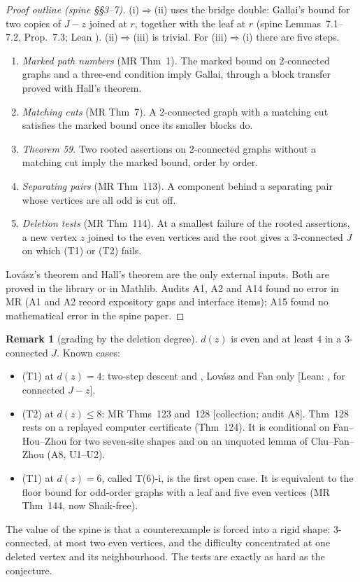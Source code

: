 \documentclass[11pt]{amsart}
\theoremstyle{definition}
\newtheorem{remark}[theorem]{Remark}
\newcommand{\st}[1]{\textsf{\small[#1]}}
\begin{document}
\begin{proof}[Proof outline (spine \S\S3--7)]
(i)$\Rightarrow$(ii) uses the bridge double: Gallai's bound for two copies of $J-z$ joined at
$r$, together with the leaf at $r$ (spine Lemmas~7.1--7.2, Prop.~7.3; Lean ).
(ii)$\Rightarrow$(iii) is trivial. For (iii)$\Rightarrow$(i) there are five steps.
\begin{enumerate}[leftmargin=*]
\item \emph{Marked path numbers} (MR Thm~1). The marked bound on $2$-connected graphs and a three-end
condition imply Gallai, through a block transfer proved with Hall's theorem.
\item \emph{Matching cuts} (MR Thm~7). A $2$-connected graph with a matching cut satisfies the marked
bound once its smaller blocks do.
\item \emph{Theorem 59}. Two rooted assertions on $2$-connected graphs without a matching cut imply
the marked bound, order by order.
\item \emph{Separating pairs} (MR Thm~113). A component behind a separating pair whose vertices are
all odd is cut off.
\item \emph{Deletion tests} (MR Thm~114). At a smallest failure of the rooted assertions, a new vertex
$z$ joined to the even vertices and the root gives a $3$-connected $J$ on which (T1) or (T2) fails.
\end{enumerate}
Lov\'asz's theorem and Hall's theorem are the only external inputs. Both are proved in the library or
in Mathlib. Audits A1, A2 and A14 found no error in MR (A1 and A2 record expository gaps and interface items);
A15 found no mathematical error in the spine paper.
\end{proof}

\begin{remark}[grading by the deletion degree]\label{rem:grading}
$d(z)$ is even and at least $4$ in a $3$-connected $J$. Known cases:
\begin{itemize}[leftmargin=*]
\item (T1) at $d(z)=4$: two-step descent and , Lovász and Fan only
\st{Lean: , for connected $J-z$}.
\item (T2) at $d(z)\le8$: MR Thms~123 and~128 \st{collection; audit A8}. Thm~128 rests on a replayed
computer certificate (Thm~124). It is conditional on Fan--Hou--Zhou for two seven-site shapes and on
an unquoted lemma of Chu--Fan--Zhou (A8, U1--U2).
\item (T1) at $d(z)=6$, called T(6)-i, is the first open case. It is equivalent to the floor bound
for odd-order graphs with a leaf and five even vertices (MR Thm~144, now Shaik-free).
\end{itemize}
The value of the spine is that a counterexample is forced into a rigid shape: $3$-connected, at most
two even vertices, and the difficulty concentrated at one deleted vertex and its neighbourhood. The
tests are exactly as hard as the conjecture.
\end{remark}
\end{document}
